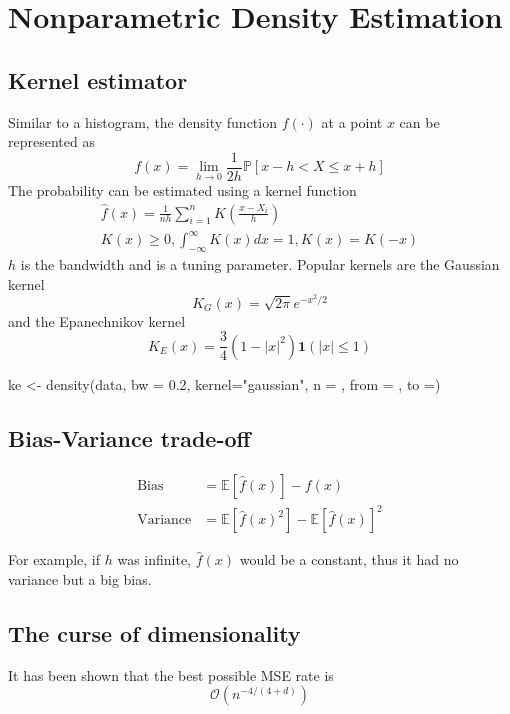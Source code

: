 \section{Nonparametric Density Estimation}
\subsection{Kernel estimator}
\begin{theory}
Similar to a histogram, the density function $f(\cdot)$ at a point $x$ can be represented as
\begin{equation*}
 f(x) = \lim_{h\to 0} \frac{1}{2h} \mathbb{P}[x-h < X \leq x+h]
\end{equation*}
The probability can be estimated using a kernel function
\begin{gather*}
 \hat{f}(x) = \frac{1}{nh} \sum_{i=1}^n K \left( \frac{x - X_i}{h} \right) \\
 K(x) \geq 0, \int_{-\infty}^{\infty} K(x) dx = 1, K(x) = K(-x)
\end{gather*}
$h$ is the bandwidth and is a tuning parameter. Popular kernels are the Gaussian kernel
\begin{equation*}
 K_G(x) = \sqrt{2\pi} e^{-x^2 / 2}
\end{equation*}
and the Epanechnikov kernel
\begin{equation*}
 K_E(x) = \frac{3}{4} \left( 1 - |x|^2 \right) \mathbf{1} (|x| \leq 1)
\end{equation*}
\end{theory}
\begin{code}
 ke <- density(data, bw = 0.2, kernel="gaussian", n = , from = , to =)
\end{code}


\subsection{Bias-Variance trade-off}
\begin{theory}
\begin{align*}
 \text{Bias} &= \mathbb{E}[\hat{f}(x)] - f(x)\\
 \text{Variance} &= \mathbb{E}[\hat{f}(x)^2] - \mathbb{E}[\hat{f}(x)]^2
\end{align*}

For example, if $h$ was infinite, $\hat{f}(x)$ would be a constant, thus it had no variance but a big bias.
\end{theory}

\subsection{The curse of dimensionality}
\begin{theory}
It has been shown that the best possible MSE rate is
\begin{equation*}
 \mathcal{O}(n^{-4/(4+d)})
\end{equation*}
\end{theory}